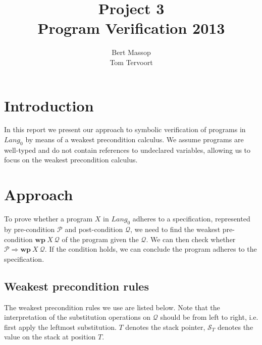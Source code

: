 \documentclass[a4paper]{article}
\title{Project 3\\\large\sc Program Verification 2013}
\author{Bert Massop\\Tom Tervoort}
\newcommand{\Q}{\mathcal{Q}}
\renewcommand{\P}{\mathcal{P}}
\renewcommand{\wp}{\mathbf{wp}}
\newcommand{\stack}[1]{\mathcal{S}_{#1}}
\begin{document}
\maketitle

\tableofcontents\clearpage

\section{Introduction}
In this report we present our approach to symbolic verification of programs in $\mathit{Lang}_0$ by means of a weakest precondition calculus. We assume programs are well-typed and do not contain references to undeclared variables, allowing us to focus on the weakest precondition calculus.

\section{Approach}
To prove whether a program $X$ in $\mathit{Lang}_0$ adheres to a specification, represented by pre-condition $\P$ and post-condition $\Q$, we need to find the weakest pre-condition $\wp\ X\ \Q$ of the program given the $\Q$. We can then check whether $\P \Rightarrow \wp\ X\ \Q$. If the condition holds, we can conclude the program adheres to the specification.

\subsection{Weakest precondition rules}
The weakest precondition rules we use are listed below. Note that the interpretation of the substitution operations on $\Q$ should be from left to right, i.e. first apply the leftmost substitution. $T$ denotes the stack pointer, $\stack{T}$ denotes the value on the stack at position $T$.
\end{document}
